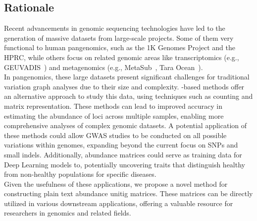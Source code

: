 \subsection{Rationale}
Recent advancements in genomic sequencing technologies have led to the generation of massive datasets from large-scale projects. Some of them very functional to human pangenomics, such as the 1K Genomes Project and the HPRC, while others focus on related genomic areas like transcriptomics (e.g., GEUVADIS~\cite{geuvadis}) and metagenomics (e.g.,  MetaSub~\cite{metasub}, Tara Ocean~\cite{tara}).\\
In pangenomics, these large datasets present significant challenges for traditional variation graph analyses due to their size and complexity. \kmer-based methods offer an alternative approach to study this data, using techniques such as \kmer counting and matrix representation. These methods can lead to improved accuracy in estimating the abundance of loci across multiple samples, enabling more comprehensive analyses of complex genomic datasets. A potential application of these methods could allow GWAS studies to be conducted on all possible variations within genomes, expanding beyond the current focus on SNPs and small indels. Additionally, \kmer abundance matrices could serve as training data for Deep Learning models to, potentially uncovering traits that distinguish healthy from non-healthy populations for specific diseases.\\
Given the usefulness of these applications, we propose a novel method for constructing plain text abundance unitig matrices. These matrices can be directly utilized in various downstream applications, offering a valuable resource for researchers in genomics and related fields.

